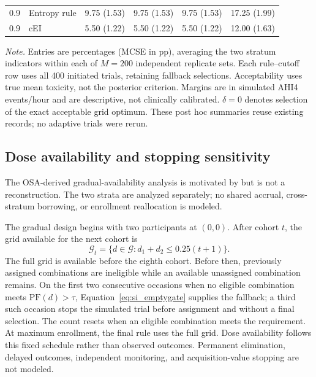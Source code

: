 \documentclass[11pt]{article}
\newcommand{\rev}[1]{{#1}}
\newcommand{\revisioncolor}{}
\newcommand{\PF}{\mathrm{PF}}
\begin{document}
\begin{table}[H]
\begin{tabular}{@{}clcccc@{}}
0.9 & Entropy rule & 9.75 (1.53) & 9.75 (1.53) & 9.75 (1.53) & 17.25 (1.99) \\
0.9 & cEI & 5.50 (1.22) & 5.50 (1.22) & 5.50 (1.22) & 12.00 (1.63) \\
\bottomrule
\end{tabular}
\vspace{3pt}
\begin{minipage}{0.98\linewidth}
\scriptsize\raggedright
\textit{Note.} Entries are percentages (MCSE in pp), averaging the two stratum indicators within each of $M=200$ independent replicate sets. Each rule--cutoff row uses all 400 initiated trials, retaining fallback selections. Acceptability uses true mean toxicity, not the posterior criterion. Margins are in simulated AHI4 events/hour and are descriptive, not clinically calibrated. $\delta=0$ denotes selection of the exact acceptable grid optimum. These post hoc summaries reuse existing records; no adaptive trials were rerun.
\end{minipage}
\end{table}

\subsection{Dose availability and stopping sensitivity}\label{sec:protocolscaffold}

The OSA-derived gradual-availability analysis is motivated by \citet{willardobd} but is not a reconstruction. The two strata are analyzed separately; no shared accrual, cross-stratum borrowing, or enrollment reallocation is modeled.

\rev{The gradual design begins with two participants at $(0,0)$. After cohort $t$, the grid available for the next cohort is}
\[
\revisioncolor
 \mathcal G_t=\{d\in\mathcal G:d_1+d_2\le0.25(t+1)\}.
\]
\rev{The full grid is available before the eighth cohort.} Before then, previously assigned combinations are ineligible while an available unassigned combination remains. On the first two consecutive occasions when no eligible combination meets $\PF(d)>\tau$, Equation~\eqref{eq:si_emptygate} supplies the fallback; a third such occasion stops the simulated trial before assignment and without a final selection. The count resets when an eligible combination meets the requirement. At maximum enrollment, the final rule uses the full grid. Dose availability follows this fixed schedule rather than observed outcomes. Permanent elimination, delayed outcomes, independent monitoring, and acquisition-value stopping are not modeled.
\end{document}
